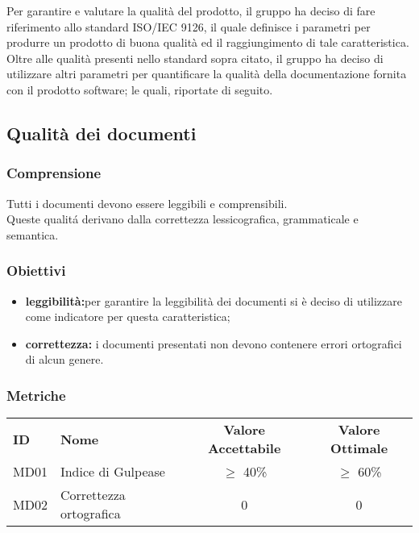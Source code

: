 Per garantire e valutare la qualità del prodotto, il gruppo ha deciso di fare riferimento allo standard ISO/IEC 9126, il quale definisce i parametri per produrre un prodotto di buona qualità ed il raggiungimento di tale caratteristica. \\
Oltre alle qualità presenti nello standard sopra citato, il gruppo ha deciso di utilizzare altri parametri per quantificare la qualità della documentazione fornita con il prodotto software; le quali, riportate di seguito.

\subsection{Qualità dei documenti}

\subsubsection{Comprensione}
Tutti i documenti devono essere leggibili e comprensibili.\\
Queste qualitá derivano dalla correttezza lessicografica, grammaticale e semantica.

\subsubsection{Obiettivi}
\begin{itemize}
    \item \textbf{leggibilità:}per garantire la leggibilità dei documenti si è deciso di utilizzare  come indicatore per questa caratteristica;
    \item \textbf{correttezza:} i documenti presentati non devono contenere errori ortografici di alcun genere.
\end{itemize}

\subsubsection{Metriche}

\begin{table} [h!]
	\begin{center}
		\begin{tabular} {m{2 cm} m{7 cm} c c }
			\rowcolor{lightgray}
			\textbf{ID} & \textbf{Nome}& \textbf{Valore Accettabile} & \textbf{Valore Ottimale}\\
			MD01 & Indice di Gulpease  		 & $\geq$ 40\%    			& $\geq$ 60\% \\
			MD02 & Correttezza ortografica 				&0						&0
		\end{tabular}
	\end{center}
\end{table}